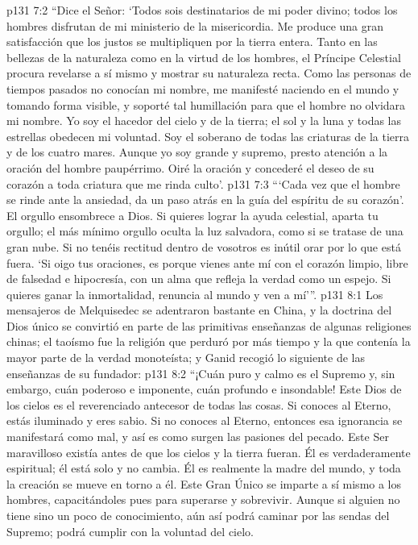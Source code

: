 \vs p131 7:2 \pc “Dice el Señor: ‘Todos sois destinatarios de mi poder divino; todos los hombres disfrutan de mi ministerio de la misericordia. Me produce una gran satisfacción que los justos se multipliquen por la tierra entera. Tanto en las bellezas de la naturaleza como en la virtud de los hombres, el Príncipe Celestial procura revelarse a sí mismo y mostrar su naturaleza recta. Como las personas de tiempos pasados no conocían mi nombre, me manifesté naciendo en el mundo y tomando forma visible, y soporté tal humillación para que el hombre no olvidara mi nombre. Yo soy el hacedor del cielo y de la tierra; el sol y la luna y todas las estrellas obedecen mi voluntad. Soy el soberano de todas las criaturas de la tierra y de los cuatro mares. Aunque yo soy grande y supremo, presto atención a la oración del hombre paupérrimo. Oiré la oración y concederé el deseo de su corazón a toda criatura que me rinda culto’.
\vs p131 7:3 “‘Cada vez que el hombre se rinde ante la ansiedad, da un paso atrás en la guía del espíritu de su corazón'. El orgullo ensombrece a Dios. Si quieres lograr la ayuda celestial, aparta tu orgullo; el más mínimo orgullo oculta la luz salvadora, como si se tratase de una gran nube. Si no tenéis rectitud dentro de vosotros es inútil orar por lo que está fuera. ‘Si oigo tus oraciones, es porque vienes ante mí con el corazón limpio, libre de falsedad e hipocresía, con un alma que refleja la verdad como un espejo. Si quieres ganar la inmortalidad, renuncia al mundo y ven a mí’”.
\vs p131 8:1 Los mensajeros de Melquisedec se adentraron bastante en China, y la doctrina del Dios único se convirtió en parte de las primitivas enseñanzas de algunas religiones chinas; el taoísmo fue la religión que perduró por más tiempo y la que contenía la mayor parte de la verdad monoteísta; y Ganid recogió lo siguiente de las enseñanzas de su fundador:
\vs p131 8:2 \pc “¡Cuán puro y calmo es el Supremo y, sin embargo, cuán poderoso e imponente, cuán profundo e insondable! Este Dios de los cielos es el reverenciado antecesor de todas las cosas. Si conoces al Eterno, estás iluminado y eres sabio. Si no conoces al Eterno, entonces esa ignorancia se manifestará como mal, y así es como surgen las pasiones del pecado. Este Ser maravilloso existía antes de que los cielos y la tierra fueran. Él es verdaderamente espiritual; él está solo y no cambia. Él es realmente la madre del mundo, y toda la creación se mueve en torno a él. Este Gran Único se imparte a sí mismo a los hombres, capacitándoles pues para superarse y sobrevivir. Aunque si alguien no tiene sino un poco de conocimiento, aún así podrá caminar por las sendas del Supremo; podrá cumplir con la voluntad del cielo.

